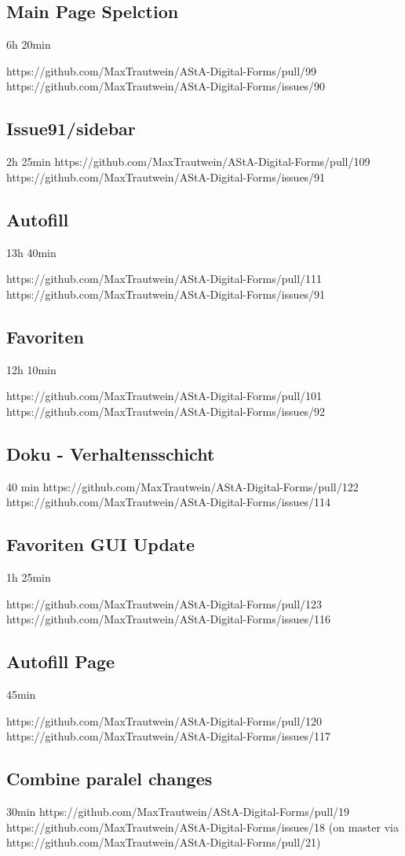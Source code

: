 \subsection{Main Page Spelction}
6h 20min

https://github.com/MaxTrautwein/AStA-Digital-Forms/pull/99
https://github.com/MaxTrautwein/AStA-Digital-Forms/issues/90

\subsection{Issue91/sidebar}
2h 25min
https://github.com/MaxTrautwein/AStA-Digital-Forms/pull/109
https://github.com/MaxTrautwein/AStA-Digital-Forms/issues/91
\subsection{Autofill}
13h 40min

https://github.com/MaxTrautwein/AStA-Digital-Forms/pull/111
https://github.com/MaxTrautwein/AStA-Digital-Forms/issues/91
\subsection{Favoriten}
12h 10min

https://github.com/MaxTrautwein/AStA-Digital-Forms/pull/101
https://github.com/MaxTrautwein/AStA-Digital-Forms/issues/92
\subsection{Doku - Verhaltensschicht}
40 min
https://github.com/MaxTrautwein/AStA-Digital-Forms/pull/122
https://github.com/MaxTrautwein/AStA-Digital-Forms/issues/114

\subsection{Favoriten GUI Update}
1h 25min

https://github.com/MaxTrautwein/AStA-Digital-Forms/pull/123
https://github.com/MaxTrautwein/AStA-Digital-Forms/issues/116
\subsection{Autofill Page}
45min

https://github.com/MaxTrautwein/AStA-Digital-Forms/pull/120
https://github.com/MaxTrautwein/AStA-Digital-Forms/issues/117

\subsection{Combine paralel changes}
30min
https://github.com/MaxTrautwein/AStA-Digital-Forms/pull/19
https://github.com/MaxTrautwein/AStA-Digital-Forms/issues/18
(on master via https://github.com/MaxTrautwein/AStA-Digital-Forms/pull/21)

